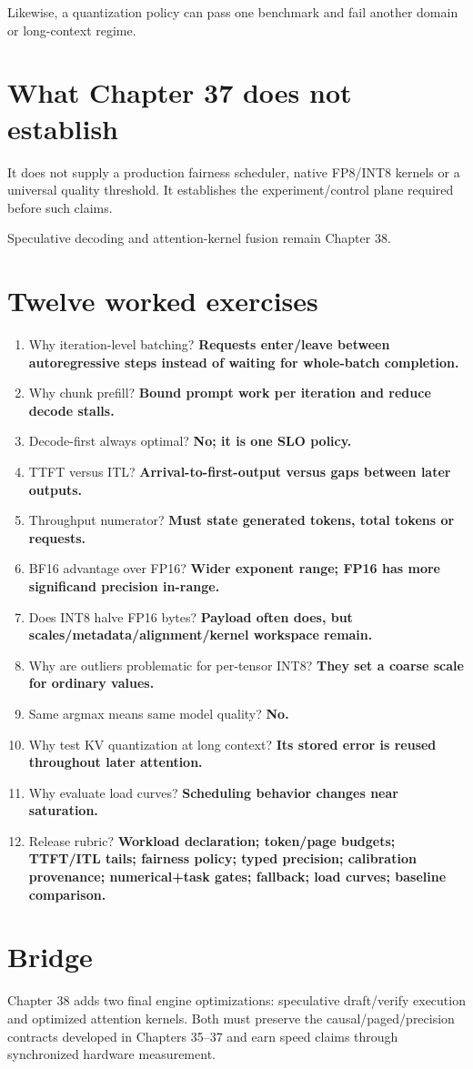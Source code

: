 Likewise, a quantization policy can pass one benchmark and fail another domain or long-context regime.

\section{What Chapter 37 does not establish}
It does not supply a production fairness scheduler, native FP8/INT8 kernels or a universal quality threshold. It establishes the experiment/control plane required before such claims.

Speculative decoding and attention-kernel fusion remain Chapter 38.

\section{Twelve worked exercises}
\begin{enumerate}
\item Why iteration-level batching? \textbf{Requests enter/leave between autoregressive steps instead of waiting for whole-batch completion.}
\item Why chunk prefill? \textbf{Bound prompt work per iteration and reduce decode stalls.}
\item Decode-first always optimal? \textbf{No; it is one SLO policy.}
\item TTFT versus ITL? \textbf{Arrival-to-first-output versus gaps between later outputs.}
\item Throughput numerator? \textbf{Must state generated tokens, total tokens or requests.}
\item BF16 advantage over FP16? \textbf{Wider exponent range; FP16 has more significand precision in-range.}
\item Does INT8 halve FP16 bytes? \textbf{Payload often does, but scales/metadata/alignment/kernel workspace remain.}
\item Why are outliers problematic for per-tensor INT8? \textbf{They set a coarse scale for ordinary values.}
\item Same argmax means same model quality? \textbf{No.}
\item Why test KV quantization at long context? \textbf{Its stored error is reused throughout later attention.}
\item Why evaluate load curves? \textbf{Scheduling behavior changes near saturation.}
\item Release rubric? \textbf{Workload declaration; token/page budgets; TTFT/ITL tails; fairness policy; typed precision; calibration provenance; numerical+task gates; fallback; load curves; baseline comparison.}
\end{enumerate}

\section{Bridge}
Chapter 38 adds two final engine optimizations: speculative draft/verify execution and optimized attention kernels. Both must preserve the causal/paged/precision contracts developed in Chapters 35--37 and earn speed claims through synchronized hardware measurement.
